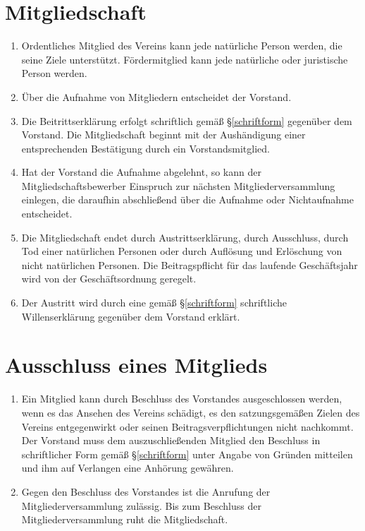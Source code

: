 \documentclass[fontsize=12pt,paper=a4,pagesize]{scrartcl}
\begin{document}
\section{Mitgliedschaft}
\begin{enumerate}
	\item Ordentliches Mitglied des Vereins kann jede natürliche Person werden,
		die seine Ziele unterstützt. Fördermitglied kann jede natürliche oder
		juristische Person werden.

	\item Über die Aufnahme von Mitgliedern entscheidet der Vorstand.

	\item Die Beitrittserklärung erfolgt schriftlich gemäß §\ref{schriftform}
		gegenüber dem Vorstand. Die Mitgliedschaft beginnt mit der Aushändigung einer
		entsprechenden Bestätigung durch ein Vorstandsmitglied.

	\item Hat der Vorstand die Aufnahme abgelehnt, so kann der
		Mitgliedschaftsbewerber Einspruch zur nächsten Mitgliederversammlung
		einlegen, die daraufhin abschließend über die Aufnahme oder Nichtaufnahme
		entscheidet.

	\item Die Mitgliedschaft endet durch Austrittserklärung, durch
		Ausschluss, durch Tod einer natürlichen Personen oder durch Auflösung
		und Erlöschung von nicht natürlichen Personen. Die Beitragspflicht
		für das laufende Geschäftsjahr wird von der Geschäftsordnung geregelt.

	\item Der Austritt wird durch eine gemäß §\ref{schriftform}
		schriftliche Willenserklärung gegenüber dem Vorstand erklärt.

\end{enumerate}

\section{Ausschluss eines Mitglieds}

\begin{enumerate}
	\item Ein Mitglied kann durch Beschluss des Vorstandes ausgeschlossen
		werden, wenn es das Ansehen des Vereins schädigt, es den satzungsgemäßen
		Zielen des Vereins entgegenwirkt oder seinen Beitragsverpflichtungen
		nicht nachkommt. Der Vorstand muss dem auszuschließenden Mitglied den
		Beschluss in schriftlicher Form gemäß §\ref{schriftform} unter Angabe von Gründen
		mitteilen und ihm auf Verlangen eine Anhörung gewähren.

	\item Gegen den Beschluss des Vorstandes ist die Anrufung der
		Mitgliederversammlung zulässig. Bis zum Beschluss der
		Mitgliederversammlung ruht die Mitgliedschaft.
\end{enumerate}
\end{document}
